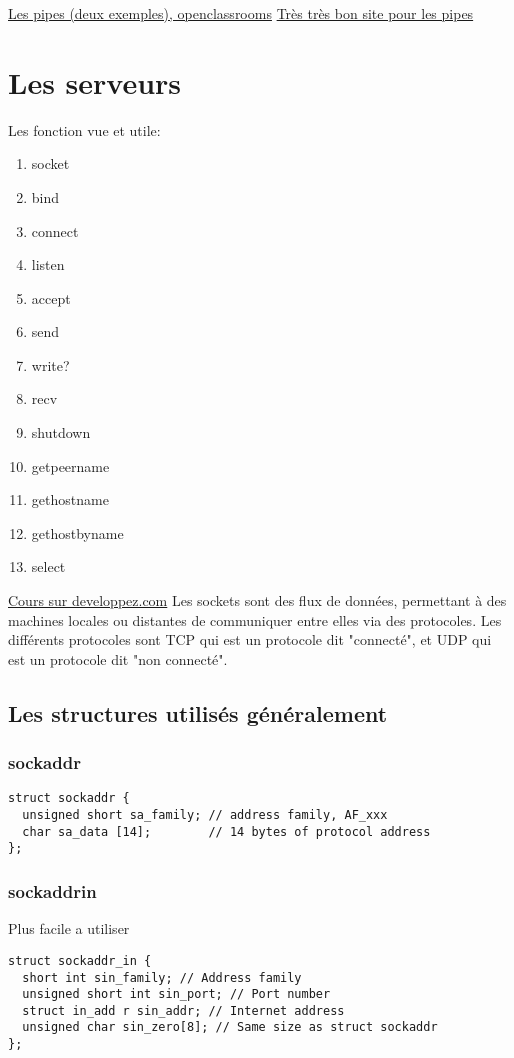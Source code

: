 \documentclass[a4paper]{article}
\begin{document}
\href{https://openclassrooms.com/courses/la-programmation-systeme-en-c-sous-unix/les-tubes}{Les pipes (deux exemples), openclassrooms}\newline
\href{http://www.zeitoun.net/articles/communication-par-tuyau/start}{Très très bon site pour les pipes}
\newpage
\section{Les serveurs}
Les fonction vue et utile:
\begin{enumerate}
  \item socket
  \item bind
  \item connect
  \item listen
  \item accept
  \item send
  \item write?
  \item recv
  \item shutdown
  \item getpeername
  \item gethostname
  \item gethostbyname
  \item select
\end{enumerate}
\href{http://broux.developpez.com/articles/c/sockets/}{Cours sur developpez.com}
Les sockets sont des flux de données, permettant à des machines locales ou distantes de communiquer entre elles via des protocoles. Les différents protocoles sont TCP qui est un protocole dit "connecté", et UDP qui est un protocole dit "non connecté".
\subsection{Les structures utilisés généralement}
\subsubsection{sockaddr}
\begin{lstlisting}
struct sockaddr {
  unsigned short sa_family; // address family, AF_xxx
  char sa_data [14];        // 14 bytes of protocol address
};
\end{lstlisting}
\subsubsection{sockaddr\textunderscore{}in}
Plus facile a utiliser
\begin{lstlisting}
struct sockaddr_in {
  short int sin_family; // Address family
  unsigned short int sin_port; // Port number
  struct in_add r sin_addr; // Internet address
  unsigned char sin_zero[8]; // Same size as struct sockaddr
};
\end{lstlisting}
\end{document}
